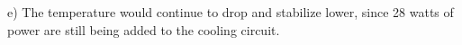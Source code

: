e) The temperature would continue to drop and stabilize lower, since 28 watts of power are still being added to the cooling circuit.